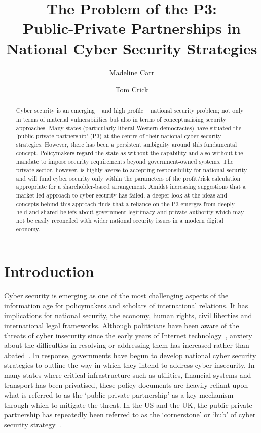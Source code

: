 \documentclass[a4paper,11pt]{article}
\title{\vspace{-4em}The Problem of the P3:\\Public-Private Partnerships in National Cyber Security Strategies}
\author[1]{Madeline Carr}
\author[2]{Tom Crick}
\affil[1]{Department of International Politics, Aberystwyth University}
\affil[2]{Department of Computing \& Information Systems, Cardiff Metropolitan University}
\affil[1]{\protect\url{madeline.carr@aber.ac.uk}}
\affil[2]{\protect\url{tcrick@cardiffmet.ac.uk}}
\date{ }
\begin{document}
\maketitle

\begin{abstract}
Cyber security is an emerging -- and high profile -- national security
problem; not only in terms of material vulnerabilities but also in
terms of conceptualising security approaches. Many states
(particularly liberal Western democracies) have situated the
'public-private partnership' (P3) at the centre of their national
cyber security strategies. However, there has been a persistent
ambiguity around this fundamental concept. Policymakers regard the
state as without the capability and also without the mandate to impose
security requirements beyond government-owned systems. The private
sector, however, is highly averse to accepting responsibility for
national security and will fund cyber security only within the
parameters of the profit/risk calculation appropriate for a
shareholder-based arrangement. Amidst increasing suggestions that a
market-led approach to cyber security has failed, a deeper look at the
ideas and concepts behind this approach finds that a reliance on the
P3 emerges from deeply held and shared beliefs about government
legitimacy and private authority which may not be easily reconciled
with wider national security issues in a modern digital economy.
\end{abstract}

\section{Introduction}

Cyber security is emerging as one of the most challenging aspects of
the information age for policymakers and scholars of international
relations. It has implications for national security, the economy,
human rights, civil liberties and international legal
frameworks. Although politicians have been aware of the threats of
cyber insecurity since the early years of Internet
technology~\cite{clinton:1992}, anxiety about the difficulties in
resolving or addressing them has increased rather than
abated~\cite{obama:2009}. In response, governments have begun to
develop national cyber security strategies to outline the way in which
they intend to address cyber insecurity. In many states where critical
infrastructure such as utilities, financial systems and transport has
been privatised, these policy documents are heavily reliant upon what
is referred to as the `public-private partnership' as a key mechanism
through which to mitigate the threat. In the US and the UK, the
public-private partnership has repeatedly been referred to as the
`cornerstone' or `hub' of cyber security
strategy~\cite{clinton:1992,gwbush:2003,maude:2012}.
\end{document}
